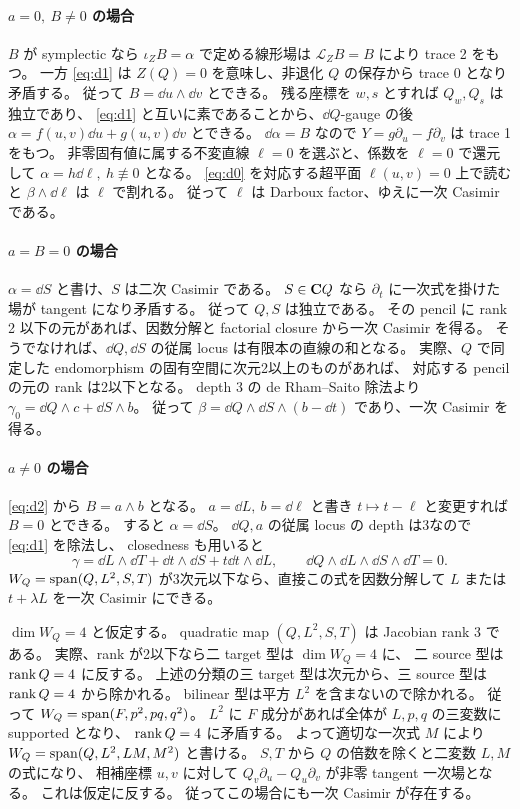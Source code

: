 \documentclass[11pt,a4paper]{ltjsarticle}
\theoremstyle{remark}\newtheorem{remark}[theorem]{注意}\renewcommand{\proofname}{証明}
\begin{document}
\paragraph{$a=0,\ B\ne0$ の場合}
$B$ が symplectic なら $\iota_ZB=\alpha$ で定める線形場は
$\mathcal L_ZB=B$ により trace 2 をもつ。
一方 \eqref{eq:d1} は $Z(Q)=0$ を意味し、非退化 $Q$ の保存から trace 0 となり矛盾する。
従って $B=\dd u\wedge\dd v$ とできる。
残る座標を $w,s$ とすれば $Q_w,Q_s$ は独立であり、
\eqref{eq:d1} と互いに素であることから、$\dd Q$-gauge の後
$\alpha=f(u,v)\dd u+g(u,v)\dd v$ とできる。
$\dd\alpha=B$ なので $Y=g\partial_u-f\partial_v$ は trace 1 をもつ。
非零固有値に属する不変直線 $\ell=0$ を選ぶと、係数を $\ell=0$ で還元して
$\alpha=h\dd\ell,\ h\not\equiv0$ となる。
\eqref{eq:d0} を対応する超平面 $\ell(u,v)=0$ 上で読むと
$\beta\wedge\dd\ell$ は $\ell$ で割れる。
従って $\ell$ は Darboux factor、ゆえに一次 Casimir である。

\paragraph{$a=B=0$ の場合}
$\alpha=\dd S$ と書け、$S$ は二次 Casimir である。
$S\in\mathbf C Q$ なら $\partial_t$ に一次式を掛けた場が tangent になり矛盾する。
従って $Q,S$ は独立である。
その pencil に rank 2 以下の元があれば、因数分解と factorial closure から一次 Casimir を得る。
そうでなければ、$\dd Q,\dd S$ の従属 locus は有限本の直線の和となる。
実際、$Q$ で同定した endomorphism の固有空間に次元2以上のものがあれば、
対応する pencil の元の rank は2以下となる。
depth 3 の de Rham--Saito 除法より
$\gamma_0=\dd Q\wedge c+\dd S\wedge b$。
従って $\beta=\dd Q\wedge\dd S\wedge(b-\dd t)$ であり、一次 Casimir を得る。

\paragraph{$a\ne0$ の場合}
\eqref{eq:d2} から $B=a\wedge b$ となる。
$a=\dd L,\ b=\dd\ell$ と書き $t\mapsto t-\ell$ と変更すれば $B=0$ とできる。
すると $\alpha=\dd S$。
$\dd Q,a$ の従属 locus の depth は3なので \eqref{eq:d1} を除法し、
closedness も用いると
\[
 \gamma=\dd L\wedge\dd T+\dd t\wedge\dd S+t\dd t\wedge\dd L,
 \qquad \dd Q\wedge\dd L\wedge\dd S\wedge\dd T=0.
\]
$W_Q=\operatorname{span}(Q,L^2,S,T)$ が3次元以下なら、直接この式を因数分解して
$L$ または $t+\lambda L$ を一次 Casimir にできる。

$\dim W_Q=4$ と仮定する。
quadratic map $(Q,L^2,S,T)$ は Jacobian rank 3 である。
実際、rank が2以下なら二 target 型は $\dim W_Q=4$ に、
二 source 型は $\operatorname{rank} Q=4$ に反する。
上述の分類の三 target 型は次元から、三 source 型は $\operatorname{rank} Q=4$ から除かれる。
bilinear 型は平方 $L^2$ を含まないので除かれる。
従って $W_Q=\operatorname{span}(F,p^2,pq,q^2)$。
$L^2$ に $F$ 成分があれば全体が $L,p,q$ の三変数に supported となり、
$\operatorname{rank} Q=4$ に矛盾する。
よって適切な一次式 $M$ により
$W_Q=\operatorname{span}(Q,L^2,LM,M^2)$ と書ける。
$S,T$ から $Q$ の倍数を除くと二変数 $L,M$ の式になり、
相補座標 $u,v$ に対して
$Q_v\partial_u-Q_u\partial_v$ が非零 tangent 一次場となる。
これは仮定に反する。
従ってこの場合にも一次 Casimir が存在する。
\end{document}

